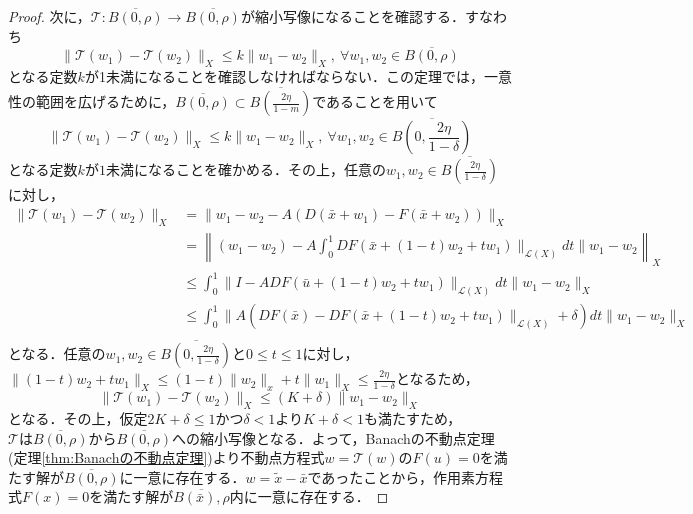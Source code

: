 \documentclass[11pt,a4paper,titlepage]{jsreport}
\theoremstyle{definition}
\begin{document}
\begin{proof}
  次に，$\mathcal{T}:\overline{B(0,\rho)}\rightarrow \overline{B(0,\rho)}$が縮小写像になることを確認する．すなわち
  \begin{equation*}
    \|\mathcal{T}(w_1) - \mathcal{T} (w_2)\|_X \leq k \|w_1-w_2\|_X,\ \forall w_1,w_2\in \overline{B(0,\rho)}
  \end{equation*}
  となる定数$k$が1未満になることを確認しなければならない．この定理では，一意性の範囲を広げるために，$\overline{B(0,\rho)}\subset \overline{B\left(\frac{2\eta}{1-m}\right)}$であることを用いて
  \begin{equation*}
    \|\mathcal{T}(w_1) - \mathcal{T} (w_2)\|_X \leq k \|w_1-w_2\|_X,\ \forall w_1,w_2\in \overline{B\left(0,\frac{2\eta}{1-\delta}\right)}
  \end{equation*}
  となる定数$k$が$1$未満になることを確かめる．その上，任意の$w_1,w_2\in\overline{B\left(\frac{2\eta}{1-\delta}\right)}$に対し，
  \begin{align*}
    \|\mathcal{T}(w_1) - \mathcal{T} (w_2)\|_X & = \|w_1-w_2-A(D(\bar{x}+w_1)-F(\bar{x}+w_2))\|_X                                                         \\
                                               & = \left\| (w_1-w_2)-A\int_{0}^{1}DF(\bar{x}+(1-t)w_2+tw_1)\|_{\mathcal{L}(X)}dt\|w_1-w_2 \right\|_X                \\
                                               & \leq \int_{0}^{1} \|I-ADF(\bar{u}+(1-t)w_2+tw_1)\|_{\mathcal{L}(X)}dt\|w_1-w_2\|_X                    \\
                                               & \leq \int_{0}^{1} \|A(DF(\bar{x})-DF(\bar{x}+(1-t)w_2+tw_1)\|_{\mathcal{L}(X)}+\delta)dt\|w_1-w_2\|_X \\
  \end{align*}
  となる．任意の$w_1,w_2\in\overline{B\left(0,\frac{2\eta}{1-\delta}\right)}$と$0\leq t \leq 1$に対し，$\|(1-t)w_2+tw_1\|_X\leq(1-t)\|w_2\|_x+t\|w_1\|_X\leq \frac{2\eta}{1-\delta}$となるため，
  \begin{equation*}
    \|\mathcal{T}(w_1) - \mathcal{T} (w_2)\|_X \leq (K+\delta)\|w_1-w_2\|_X
  \end{equation*}
  となる．その上，仮定$2K+\delta\leq 1かつ\delta<1$より$K+\delta < 1$も満たすため，$\mathcal{T}は\overline{B(0,\rho)}から\overline{B(0,\rho)}$への縮小写像となる．よって，Banachの不動点定理(定理\ref{thm:Banachの不動点定理})より不動点方程式$w=\mathcal{T}(w)$の$F(u)=0$を満たす解が$\overline{B(0,\rho)}$に一意に存在する．$w=\tilde{x}-\bar{x}$であったことから，作用素方程式$F(x)=0$を満たす解が$\overline{B(\bar{x}),\rho}$内に一意に存在する．


\end{proof}
\end{document}
